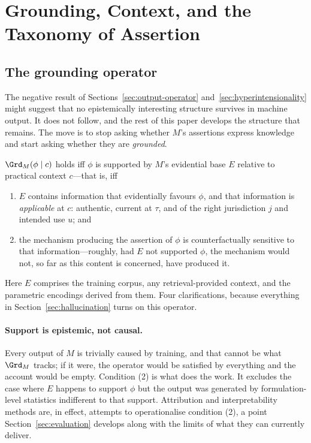 \section{Grounding, Context, and the Taxonomy of Assertion}
\label{sec:grounding}

\subsection{The grounding operator}
\label{sec:grounding-operator}

The negative result of Sections~\ref{sec:output-operator}
and~\ref{sec:hyperintensionality} might suggest that no epistemically
interesting structure survives in machine output. It does not follow, and the
rest of this paper develops the structure that remains. The move is to stop
asking whether $M$'s assertions express knowledge and start asking whether they
are \emph{grounded}.

\begin{definition}
\label{def:grounding}
$\Grd_M(\phi \mid c)$ holds iff $\phi$ is supported by $M$'s evidential base $E$
relative to practical context $c$---that is, iff
\begin{enumerate}
  \item $E$ contains information that evidentially favours $\phi$, and that
        information is \emph{applicable} at $c$: authentic, current at $\tau$,
        and of the right jurisdiction $j$ and intended use $u$; and
  \item the mechanism producing the assertion of $\phi$ is counterfactually
        sensitive to that information---roughly, had $E$ not supported $\phi$,
        the mechanism would not, so far as this content is concerned, have
        produced it.
\end{enumerate}
\end{definition}

Here $E$ comprises the training corpus, any retrieval-provided context, and the
parametric encodings derived from them. Four clarifications, because everything
in Section~\ref{sec:hallucination} turns on this operator.

\paragraph{Support is epistemic, not causal.} Every output of $M$ is trivially
caused by training, and that cannot be what $\Grd_M$ tracks; if it were, the
operator would be satisfied by everything and the account would be empty.
Condition (2) is what does the work. It excludes the case where $E$ happens to
support $\phi$ but the output was generated by formulation-level statistics
indifferent to that support. Attribution and interpretability methods are, in
effect, attempts to operationalise condition (2), a point
Section~\ref{sec:evaluation} develops along with the limits of what they can
currently deliver.

